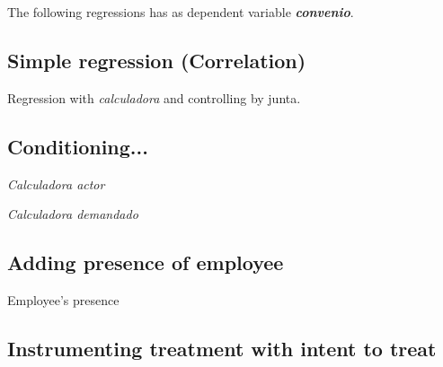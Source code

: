 \documentclass[12pt]{article}
\theoremstyle{named}
\newcommand{\folder}{C:/Users/chasi_000/Dropbox/Statistics/P10/Results/Results_2/Effect}
\begin{document}
The following regressions has as dependent variable \emph{\textbf{convenio}}.\\



\subsection*{Simple regression (Correlation)}

\begin{table}[H]\centering \caption{Regression with \emph{calculadora} and controlling by junta.}
\begin{center}
\scriptsize{}
\end{center}
\end{table}

\subsection*{Conditioning...}

\begin{table}[H]\centering \caption{\emph{Calculadora actor}}
\begin{center}
\scriptsize{}
\end{center}
\end{table}

\begin{table}[H]\centering \caption{\emph{Calculadora demandado}}
\begin{center}
\scriptsize{}
\end{center}
\end{table}


\subsection*{Adding presence of employee}

\begin{table}[H]\centering \caption{Employee's presence}
\begin{center}
\scriptsize{}
\end{center}
\end{table}

\subsection*{Instrumenting treatment with intent to treat}
\end{document}
